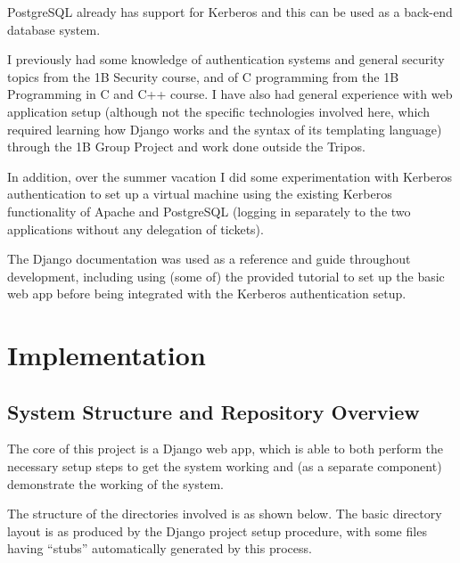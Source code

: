 \documentclass{article}
\begin{document}
PostgreSQL already has support for Kerberos and this can be used as a back-end database system.

I previously had some knowledge of authentication systems and general security topics from the 1B Security course, and of C programming from the 1B Programming in C and C++ course. I have also had general experience with web application setup (although not the specific technologies involved here, which required learning how Django works and the syntax of its templating language) through the 1B Group Project and work done outside the Tripos.

In addition, over the summer vacation I did some experimentation with Kerberos authentication to set up a virtual machine using the existing Kerberos functionality of Apache and PostgreSQL (logging in separately to the two applications without any delegation of tickets).

The Django documentation\cite{Django-docs} was used as a reference and guide throughout development, including using (some of) the provided tutorial to set up the basic web app before being integrated with the Kerberos authentication setup.


\section{Implementation}

\subsection{System Structure and Repository Overview}
The core of this project is a Django web app, which is able to both perform the necessary setup steps to get the system working and (as a separate component) demonstrate the working of the system.

The structure of the directories involved is as shown below. The basic directory layout is as produced by the Django project setup procedure, with some files having ``stubs'' automatically generated by this process.

\end{document}
